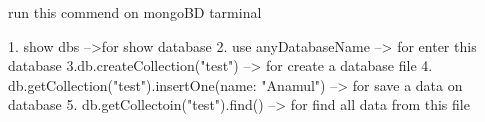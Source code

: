 run this commend on mongoBD tarminal

1. show dbs  -->for show database
2. use anyDatabaseName  --> for enter this database
3.db.createCollection("test")  --> for create a database file
4. db.getCollection("test").insertOne({name: "Anamul"})  --> for save a data on database
5. db.getCollectoin("test").find()  --> for find all data from this file

